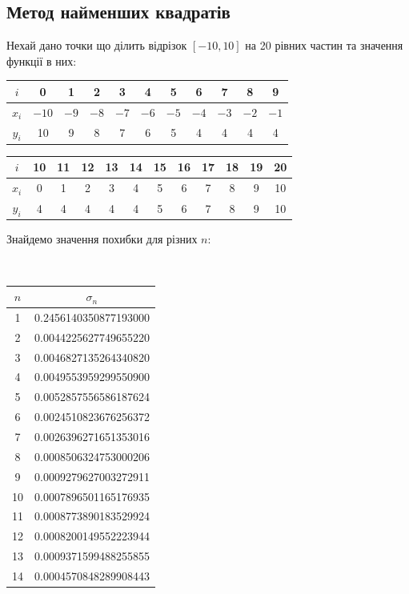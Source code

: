 \subsection{Метод найменших квадратів}

Нехай дано точки що ділить відрізок $[-10, 10]$ на 20 рівних частин та значення функції в них:

\begin{table}[H]
    \centering
    \begin{tabular}{|c|c|c|c|c|c|c|c|c|c|c|} \hline
        $i$ & 0 & 1 & 2 & 3 & 4 & 5 & 6 & 7 & 8 & 9 \\ \hline
        $x_i$ & $-10$ & $-9$ & $-8$ & $-7$ & $-6$ & $-5$ & $-4$ & $-3$ & $-2$ & $-1$ \\ \hline 
        $y_i$ & 10 & 9 & 8 & 7 & 6 & 5 & 4 & 4 & 4 & 4 \\ \hline
    \end{tabular}
    \break
    \hfill 
    \break
    \begin{tabular}{|c|c|c|c|c|c|c|c|c|c|c|c|} \hline
        $i$ & 10 & 11 & 12 & 13 & 14 & 15 & 16 & 17 & 18 & 19 & 20 \\ \hline
        $x_i$ & 0 & 1 & 2 & 3 & 4 & 5 & 6 & 7 & 8 & 9 & 10 \\ \hline
        $y_i$ & 4 & 4 & 4 & 4 & 4 & 5 & 6 & 7 & 8 & 9 & 10 \\ \hline
    \end{tabular}
\end{table}

Знайдемо значення похибки для різних $n$:

\begin{table}[H]
    \tt
    \centering
    \begin{tabular}{|c|c|} \hline
        $n$ & $\sigma_n$ \\ \hline
         1 & 0.2456140350877193000 \\ \hline 
         2 & 0.0044225627749655220 \\ \hline 
         3 & 0.0046827135264340820 \\ \hline 
         4 & 0.0049553959299550900 \\ \hline 
         5 & 0.0052857556586187624 \\ \hline 
         6 & 0.0024510823676256372 \\ \hline 
         7 & 0.0026396271651353016 \\ \hline 
         8 & 0.0008506324753000206 \\ \hline 
         9 & 0.0009279627003272911 \\ \hline 
        10 & 0.0007896501165176935 \\ \hline 
        11 & 0.0008773890183529924 \\ \hline 
        12 & 0.0008200149552223944 \\ \hline 
        13 & 0.0009371599488255855 \\ \hline 
        14 & 0.0004570848289908443 \\ \hline 
    \end{tabular}
\end{table}

